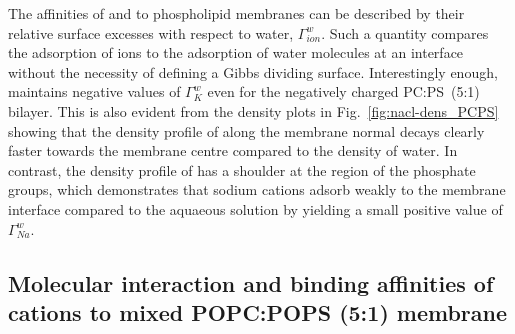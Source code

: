 \documentclass[journal=jpcbfk,manuscript=article]{achemso}
\begin{document}
% 
%
The affinities of  and  to phospholipid membranes
can be described by their relative surface excesses with respect to water, $\Gamma ^{w} _{ion}$. 
Such a quantity compares the adsorption of ions to the adsorption of water molecules at an interface 
without the necessity of defining a Gibbs dividing surface. \citep{melcr18, chattorajBOOK}
Interestingly enough,  maintains negative values of $\Gamma^{w}_{K}$ even for the negatively charged PC:PS~(5:1) bilayer.
This is also evident from the density plots in  Fig.~\ref{fig:nacl-dens_PCPS}
showing that the density profile of  along the membrane normal 
decays clearly faster towards the membrane centre compared to the density of water. 
In contrast, the density profile of  has a shoulder 
at the region of the phosphate groups,
which demonstrates that sodium cations adsorb weakly to the membrane interface compared to the aquaeous solution
by yielding a small positive value of $\Gamma^{w}_{Na}$.






 
 


\subsection{Molecular interaction and binding affinities of  cations to mixed POPC:POPS (5:1) membrane} 
\label{section:lip-ion_ca}
\end{document}
